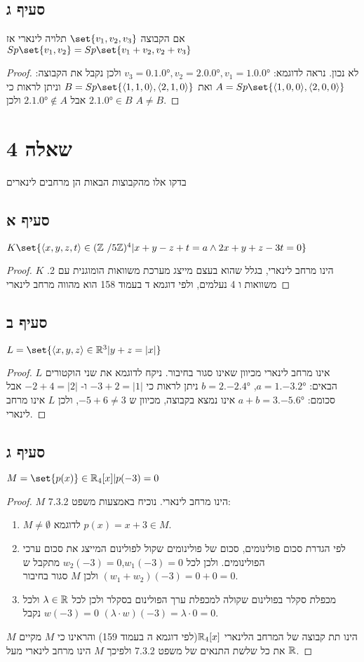 \documentclass{article}
\DeclarePairedDelimiter\set\{\}
\begin{document}
		\subsection*{סעיף ג}
		אם הקבוצה $\set{v_1, v_2, v_3}$ תלויה לינארי אז $Sp\set{v_1,v_2} = Sp\set{v_1 + v_2, v_2 + v_3}$
		\begin{proof}
			לא נכון.
			נראה לדוגמא: $v_3 = \ang{0,1,0}, v_2 = \ang{2,0,0}, v_1 = \ang{1,0,0}$
			ולכן נקבל את הקבוצה: $A = Sp\set{\ang{1,0,0}, \ang{2,0,0}}$ ואת $B = Sp\set{\ang{1,1,0}, \ang{2,1,0}}$
			וניתן  לראות כי $\ang{2,1,0} \in B$ אבל $\ang{2,1,0} \not\in A$ ולכן $A \neq B$.
		\end{proof}


		\pagebreak
		\section*{שאלה 4}
		בדקו אלו מהקבוצות הבאות הן מרחבים לינארים
		\subsection*{סעיף א}
		$K \set{\ang{x,y,z,t} \in (\ZZ\ / 5\ZZ)^4 | x+y-z+t = a \land 2x+y+z-3t=0}$
		\begin{proof}
			$K$ .הינו מרחב לינארי, בגלל שהוא בעצם מייצג מערכת משוואות הומוגנית עם 2 משוואות ו 4 נעלמים, ולפי דוגמא ד בעמוד 158 הוא מהווה מרחב לינארי
		\end{proof}

		\subsection*{סעיף ב}
		$L= \set{\ang{x,y,z} \in \RR^3 | y+z = |x|}$
		\begin{proof}
			$L$ אינו מרחב לינארי מכיוון שאינו סגור בחיבור. ניקח לדוגמא את שני הוקטורים הבאים: $a = \ang{1,-3,2}$, $b = \ang{2,-2,4}$ ניתן לראות כי $-3 + 2 = |1|$ ו- $-2 + 4 = |2|$
		אבל סכומם: $a + b = \ang{3, -5, 6}$ אינו נמצא בקבוצה, מכיוון ש $-5 + 6 \neq 3$, ולכן $L$ אינו מרחב לינארי.
		\end{proof}

		\subsection*{סעיף ג}
		$M = \set{p(x)} \in \RR_4[x] | p(-3) = 0$
		\begin{proof}
			$M$ הינו מרחב לינארי. נוכיח באמצעות משפט 7.3.2:
		\begin{enumerate}
			\item $M \neq \emptyset$ לדוגמא $p(x) = x + 3 \in M$.
			\item לפי הגדרת סכום פולינומים, סכום של פולינומים שקול לפולינום המייצג את סכום ערכי הפולינומים. ולכן לכל $w_1(-3) = 0$,$w_2(-3) = 0$ מתקבל ש $(w_1+w_2)(-3) = 0 + 0 = 0$ ולכן $M$ סגור בחיבור.
			\item מכפלת סקלר בפולינום שקולה למכפלת ערך הפולינום בסקלר ולכן לכל $\lambda \in \mathbb{R}$ ולכל $w(-3) = 0$ נקבל $(\lambda \cdot w)(-3) = \lambda \cdot 0 = 0$.
		\end{enumerate}
		$M$ הינו תת קבוצה של המרחב הלינארי $\mathbb{R}_4[x]$(לפי דוגמא ה בעמוד 159) והראינו כי $M$ מקיים את כל שלשת התנאים של משפט 7.3.2 ולפיכך $M$ הינו מרחב לינארי מעל $\mathbb{R}$.
		\end{proof}
\end{document}
